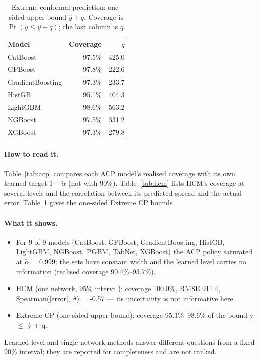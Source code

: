 \documentclass[11pt]{article}
\begin{document}
\begin{table}[t]\centering\small
\caption{Extreme conformal prediction: one-sided upper bound $\hat y+q$. Coverage is $\Pr(y\le\hat y+q)$; the last column is $q$.}\label{tab:extreme}
\begin{tabular}{lrr}\toprule Model & Coverage & $q$\\\midrule
CatBoost & 97.5\% & 425.0\\
GPBoost & 97.8\% & 222.6\\
GradientBoosting & 97.3\% & 233.7\\
HistGB & 95.1\% & 404.3\\
LightGBM & 98.6\% & 563.2\\
NGBoost & 97.5\% & 331.2\\
XGBoost & 97.3\% & 279.8\\
\bottomrule\end{tabular}\end{table}
\paragraph{How to read it.} Table~\ref{tab:acp} compares each ACP model's realised coverage with its own learned target $1-\tilde\alpha$ (not with 90\%). Table~\ref{tab:hcm} lists HCM's coverage at several levels and the correlation between its predicted spread and the actual error. Table~\ref{tab:extreme} gives the one-sided Extreme CP bounds.
\paragraph{What it shows.}
\begin{itemize}
\item For 9 of 9 models (CatBoost, GPBoost, GradientBoosting, HistGB, LightGBM, NGBoost, PGBM, TabNet, XGBoost) the ACP policy saturated at $\tilde\alpha$ = 0.999: the sets have constant width and the learned level carries no information (realised coverage 90.4\%--93.7\%).
\item HCM (one network, 95\% interval): coverage 100.0\%, RMSE 911.4, Spearman(|error|, $\sigma$̂) = -0.57 — its uncertainty is not informative here.
\item Extreme CP (one-sided upper bound): coverage 95.1\%--98.6\% of the bound y $\leq$ ŷ + q.
\end{itemize}
\begin{insight}[Takeaway RQ6]
Learned-level and single-network methods answer different questions from a fixed 90\% interval; they are reported for completeness and are not ranked.
\end{insight}
\end{document}
